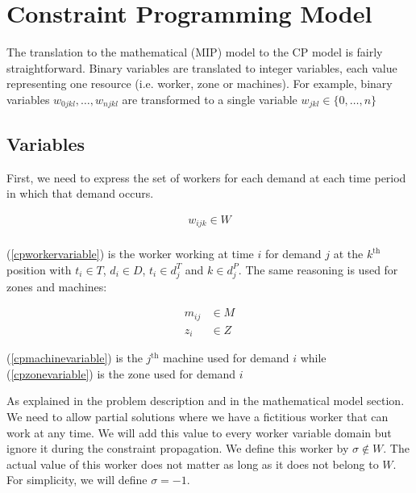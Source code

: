 \documentclass[../../thesis.tex]{subfiles}
\begin{document}
\section{Constraint Programming Model}

The translation to the mathematical (MIP) model to the CP model is fairly
straightforward. Binary variables are translated to integer variables, each value representing
one resource (i.e. worker, zone or machines). 
For example, binary variables $w_{0jkl}, \dots, w_{njkl}$ are transformed to a single variable 
$w_{jkl} \in \{0, \dots, n\}$



\subsection{Variables}

First, we need to express the set of workers for each demand at each time period in which that demand occurs.

\begin{equation}
\begin{split}
    w_{ijk} \in W \label{cpworkervariable} \\
\end{split}
\end{equation}

(\ref{cpworkervariable}) is the worker working at time $i$ for demand $j$ at the $k^{\text{th}}$ position 
with $t_i \in T$, $d_i \in D$, $t_i \in d_j^T$ and $k \in d^P_j$. The same reasoning is used for zones and machines:

\begin{align}
    m_{ij} &\in M \label{cpmachinevariable} \\ 
    z_i &\in Z \label{cpzonevariable} 
\end{align}

(\ref{cpmachinevariable}) is the $j^{\text{th}}$ machine used for demand $i$ while (\ref{cpzonevariable}) is the zone used for demand $i$



As explained in the problem description and in the mathematical model section. 
We need to allow partial solutions where we have a fictitious worker that can work at any time.
We will add this value to every worker variable domain but ignore it during the constraint propagation. We define 
this worker by $\sigma \notin W$. The actual value of this worker does not matter as long as it does not belong to $W$. For simplicity, we will define $\sigma = -1$.
\end{document}
